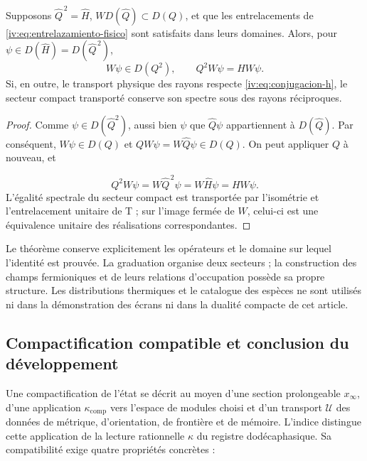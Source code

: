 \begin{theorem}
\label{iv:thm:supercarga-transporte}
Supposons \(\widehat Q^{\,2}=\widehat H\),
\(W D(\widehat Q)\subset D(Q)\), et que les
entrelacements de \eqref{iv:eq:entrelazamiento-fisico}
sont satisfaits dans leurs domaines. Alors, pour
\(\psi\in D(\widehat H)=D(\widehat Q^{\,2})\),
\[
 W\psi\in D(Q^2),\qquad Q^2W\psi=HW\psi.
\]
Si, en outre, le transport physique des rayons respecte
\eqref{iv:eq:conjugacion-h}, le secteur compact
transporté conserve son spectre sous des rayons réciproques.
\end{theorem}
\begin{proof}
Comme \(\psi\in D(\widehat Q^2)\), aussi bien
\(\psi\) que \(\widehat Q\psi\) appartiennent
à \(D(\widehat Q)\). Par conséquent, \(W\psi\in D(Q)\)
et \(QW\psi=W\widehat Q\psi\in D(Q)\). On peut
appliquer \(Q\) à nouveau, et

\[
 Q^2W\psi=W\widehat Q^{\,2}\psi
          =W\widehat H\psi=HW\psi.
\]
L’égalité spectrale du secteur compact est transportée
par l’isométrie et l’entrelacement unitaire de T ;
sur l’image fermée de \(W\), celui-ci est une
équivalence unitaire des réalisations correspondantes.
\end{proof}

Le théorème conserve explicitement les opérateurs et le
domaine sur lequel l’identité est prouvée. La
graduation organise deux secteurs ; la construction des
champs fermioniques et de leurs relations d’occupation possède
sa propre structure. Les distributions thermiques et le
catalogue des espèces ne sont utilisés ni dans la démonstration
des écrans ni dans la dualité compacte de cet
article.

\subsection{Compactification compatible et conclusion du développement
}

Une compactification de l’état se décrit au moyen
d’une section prolongeable \(x_\infty\), d’une application
\(\kappa_{\mathrm{comp}}\) vers l’espace de modules
choisi et d’un transport \(\mathcal U\) des données
de métrique, d’orientation, de frontière et de mémoire. L’indice
distingue cette application de la lecture rationnelle
\(\kappa\) du registre dodécaphasique. Sa compatibilité
exige quatre propriétés concrètes :

